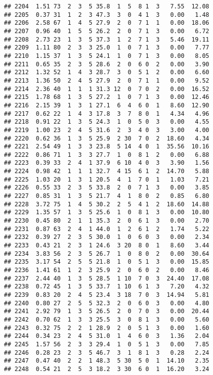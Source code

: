 \documentclass[
]{article}
\begin{document}
\begin{verbatim}
## 2204  1.51 73  2  3  5 35.8  1  5  8 1  3   7.55  12.08
## 2205  0.37 31  1  2  3 47.3  3  0  4 1  3   0.00   1.48
## 2206  2.58 67  1  4  5 27.9  2  0  7 1  1   0.00  18.06
## 2207  0.96 40  1  5  5 26.2  2  0  7 1  3   0.00   6.72
## 2208  2.73 23  1  3  5 37.3  1  2  7 1  3   5.46  19.11
## 2209  1.11 80  2  3  3 25.0  1  0  7 1  3   0.00   7.77
## 2210  1.15 37  1  3  5 24.1  1  0  7 1  3   0.00   8.05
## 2211  0.65 35  2  3  5 28.6  2  0  6 0  2   0.00   3.90
## 2212  1.32 52  1  4  3 28.7  3  0  5 1  2   0.00   6.60
## 2213  1.36 50  2  4  5 27.9  2  0  7 1  1   0.00   9.52
## 2214  2.36 40  1  1  1 31.3 12  0  7 0  2   0.00  16.52
## 2215  1.78 68  1  3  5 27.2  1  0  7 1  3   0.00  12.46
## 2216  2.15 39  1  3  1 27.1  6  4  6 0  1   8.60  12.90
## 2217  0.62 22  1  4  3 17.8  3  7  8 0  1   4.34   4.96
## 2218  0.91 22  1  3  5 24.3  1  0  5 0  3   0.00   4.55
## 2219  1.00 23  2  4  5 31.6  2  3  4 0  3   3.00   4.00
## 2220  0.62 36  1  3  5 25.9  2 30  7 0  2  18.60   4.34
## 2221  2.54 49  1  3  3 23.8  5 14  4 0  1  35.56  10.16
## 2222  0.86 71  1  3  3 27.7  1  0  8 1  2   0.00   6.88
## 2223  0.39 33  2  4  1 37.9  6 10  4 0  3   3.90   1.56
## 2224  0.98 42  1  1  1 32.7  4 15  6 1  2  14.70   5.88
## 2225  1.03 20  1  3  1 20.5  4  1  7 0  1   1.03   7.21
## 2226  0.55 33  2  3  5 33.8  2  0  7 1  3   0.00   3.85
## 2227  0.85 31  1  3  5 21.7  4  1  8 0  2   0.85   6.80
## 2228  3.72 75  1  4  5 30.2  2  5  4 1  2  18.60  14.88
## 2229  1.35 57  1  3  5 25.6  1  0  8 1  3   0.00  10.80
## 2230  0.45 80  2  1  1 35.3  2  0  6 1  3   0.00   2.70
## 2231  0.87 63  2  4  1 44.0  1  2  6 1  2   1.74   5.22
## 2232  0.39 27  2  3  5 30.0  1  0  6 0  3   0.00   2.34
## 2233  0.43 21  2  3  1 24.6  3 20  8 0  1   8.60   3.44
## 2234  3.83 56  2  3  5 26.7  1  0  8 0  2   0.00  30.64
## 2235  3.17 54  2  5  5 21.8  1  0  5 1  3   0.00  15.85
## 2236  1.41 61  1  2  3 25.9  2  0  6 0  2   0.00   8.46
## 2237  2.44 40  1  3  5 28.5  1 10  7 0  3  24.40  17.08
## 2238  0.72 45  1  3  5 33.7  1 10  6 1  3   7.20   4.32
## 2239  0.83 20  2  4  5 23.4  3 18  7 0  3  14.94   5.81
## 2240  0.80 27  2  5  5 32.3  2  0  6 0  3   0.00   4.80
## 2241  2.92 79  1  3  5 26.5  2  0  7 0  3   0.00  20.44
## 2242  0.70 62  1  3  3 25.5  3  0  8 1  3   0.00   5.60
## 2243  0.32 75  2  2  1 28.9  2  0  5 1  3   0.00   1.60
## 2244  0.34 23  2  4  5 31.0  1  4  6 0  3   1.36   2.04
## 2245  1.57 56  2  3  3 29.4  1  0  5 1  3   0.00   7.85
## 2246  0.28 23  2  3  5 46.7  3  1  8 1  3   0.28   2.24
## 2247  0.47 40  2  2  1 48.3  5 30  5 0  1  14.10   2.35
## 2248  0.54 21  2  5  3 18.2  3 30  6 0  1  16.20   3.24

\end{verbatim}
\end{document}
